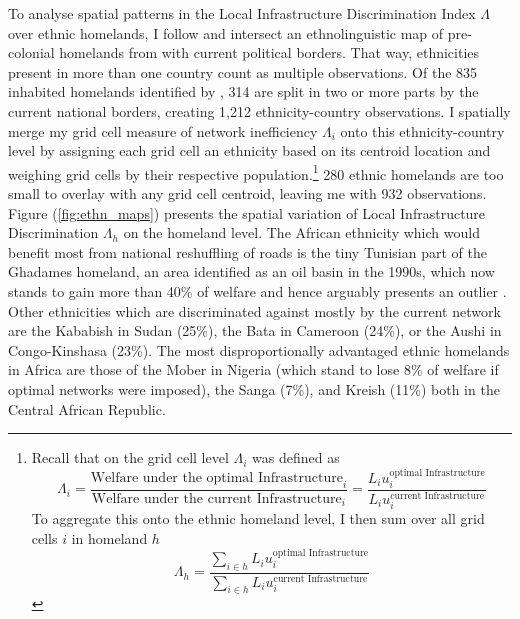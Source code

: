\documentclass[11pt, oneside]{article}   	%
\let\oldref\ref
\renewcommand{\ref}[1]{(\oldref{#1})}
\begin{document}
To analyse spatial patterns in the Local Infrastructure Discrimination Index $\Lambda$ over ethnic homelands, I follow \cite{michalopoulos_long-run_2016} and intersect an ethnolinguistic map of pre-colonial homelands from \cite{Murdock_Africaitspeoples_1959} with current political borders. That way, ethnicities present in more than one country count as multiple observations. Of the 835 inhabited homelands identified by \citeauthor{Murdock_Africaitspeoples_1959}, 314 are split in two or more parts by the current national borders, creating 1,212 ethnicity-country observations. I spatially merge my grid cell measure of network inefficiency $\Lambda_{i}$ onto this ethnicity-country level by assigning each grid cell an ethnicity based on its centroid location and weighing grid cells by their respective population.\footnote{Recall that on the grid cell level $\Lambda_{i}$ was defined as \begin{equation*}
  \Lambda_{i} = \frac{\textrm{Welfare under the optimal Infrastructure}_{i}}{\textrm{Welfare under the current Infrastructure}_{i}} = \frac{L_{i}u_{i}^{\textrm{optimal Infrastructure}}}{L_{i}u_{i}^{\textrm{current Infrastructure}}}
\end{equation*} To aggregate this onto the ethnic homeland level, I then sum over all grid cells $i$ in homeland $h$ \begin{equation*}
  \Lambda_{h} = \frac{\sum_{i \in h}^{} L_{i}u_{i}^{\textrm{optimal Infrastructure}}}{\sum_{i \in h}^{}L_{i}u_{i}^{\textrm{current Infrastructure}}}
\end{equation*}} 280 ethnic homelands are too small to overlay with any grid cell centroid, leaving me with 932 observations. Figure \ref{fig:ethn_maps} presents the spatial variation of Local Infrastructure Discrimination $\Lambda_{h}$ on the homeland level. The African ethnicity which would benefit most from national reshuffling of roads is the tiny Tunisian part of the Ghadames homeland, an area identified as an oil basin in the 1990s, which now stands to gain more than 40\% of welfare and hence arguably presents an outlier \citep{Echikh_Geologyhydrocarbonoccurrences_1998}. Other ethnicities which are discriminated against mostly by the current network are the Kababish in Sudan (25\%), the Bata in Cameroon (24\%), or the Aushi in Congo-Kinshasa (23\%). The most disproportionally advantaged ethnic homelands in Africa are those of the Mober in Nigeria (which stand to lose 8\% of welfare if optimal networks were imposed), the Sanga (7\%), and Kreish (11\%) both in the Central African Republic.
\end{document}
